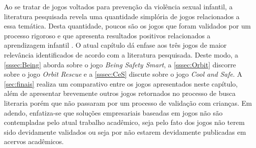 Ao se tratar de jogos voltados para prevenção da violência sexual infantil, a literatura pesquisada revela uma quantidade simplória de jogos relacionados a essa temática. Desta quantidade, poucos são os jogos que foram validados por um processo rigoroso e que apresenta resultados positivos relacionados a aprendizagem infantil \cite{jones2010being}. O atual capítulo dá enfase aos três jogos de maior relevância identificados de acordo com a literatura pesquisada. Deste modo, a \autoref{sssec:Being} aborda sobre o jogo \textit{Being Safety Smart}, a \autoref{sssec:Orbit} discorre sobre o jogo \textit{Orbit Rescue} e a \autoref{sssec:CeS} discute sobre o jogo \textit{Cool and Safe}. A \autoref{sec:finais} realiza um comparativo entre os jogos apresentados neste capítulo, além de apresentar brevemente outros jogos retornados no processo de busca literaria porém que não passaram por um processo de validação com crianças. Em adendo, enfatiza-se que soluções empresariais baseadas em jogos não são contempladas pelo atual trabalho acadêmico, seja pelo fato dos jogos não terem sido devidamente validados ou seja por não estarem devidamente publicadas em acervos acadêmicos.

















